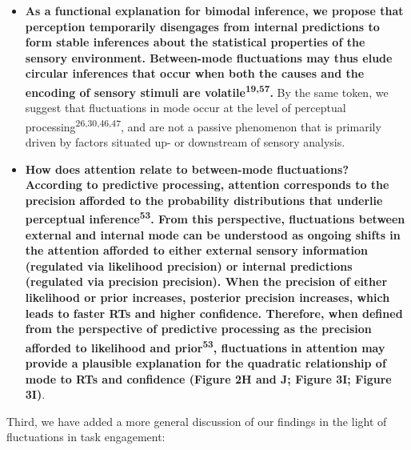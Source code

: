\documentclass[
]{article}
\begin{document}
\begin{itemize}
\item
  \textbf{As a functional explanation for bimodal inference, we propose
  that perception temporarily disengages from internal predictions to
  form stable inferences about the statistical properties of the sensory
  environment. Between-mode fluctuations may thus elude circular
  inferences that occur when both the causes and the encoding of sensory
  stimuli are volatile\textsuperscript{19,57}.} By the same token, we
  suggest that fluctuations in mode occur at the level of perceptual
  processing\textsuperscript{26,30,46,47}, and are not a passive
  phenomenon that is primarily driven by factors situated up- or
  downstream of sensory analysis.
\item
  \textbf{How does attention relate to between-mode fluctuations?
  According to predictive processing, attention corresponds to the
  precision afforded to the probability distributions that underlie
  perceptual inference\textsuperscript{53}. From this perspective,
  fluctuations between external and internal mode can be understood as
  ongoing shifts in the attention afforded to either external sensory
  information (regulated via likelihood precision) or internal
  predictions (regulated via precision precision). When the precision of
  either likelihood or prior increases, posterior precision increases,
  which leads to faster RTs and higher confidence. Therefore, when
  defined from the perspective of predictive processing as the precision
  afforded to likelihood and prior\textsuperscript{53}, fluctuations in
  attention may provide a plausible explanation for the quadratic
  relationship of mode to RTs and confidence (Figure 2H and J; Figure
  3I; Figure 3I)}.
\end{itemize}

Third, we have added a more general discussion of our findings in the
light of fluctuations in task engagement:
\end{document}
